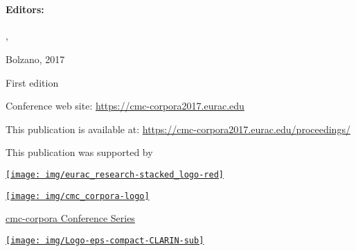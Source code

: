 \documentclass[usegeometry]{scrbook}
\title{\thetitle}
\begin{document}
\dominitoc
\pagestyle{scrheadings}

\frontmatter

\subject{Conference Proceedings}
\title{\thetitle}
\subtitle{3-4 October 2017, Eurac Research, Italy}

\author{}
\publishers{Editors \\ \authora \\ \authorb}
\date{}

\maketitle
\clearpage

\section*{\thetitle}
\paragraph{Editors:} \authora, \authorb

\bigskip
\noindent
Bolzano, 2017

\smallskip
\noindent
First edition

\bigskip 

\noindent
Conference web site:
\href{https://cmc-corpora2017.eurac.edu}{https://cmc-corpora2017.eurac.edu}

\smallskip
\noindent
This publication is available at:
\href{https://cmc-corpora2017.eurac.edu/proceedings/}{https://cmc-corpora2017.eurac.edu/proceedings/}

\vfill

This publication was supported by

\noindent
\begin{minipage}{.33\textwidth}%
    \center
    \href{http://www.eurac.edu}{\texttt{[image: img/eurac\_research-stacked\_logo-red]}}
\end{minipage}%
\begin{minipage}{.33\textwidth}%
    \center
    \href{http://cmc-corpora.org}{\texttt{[image: img/cmc\_corpora-logo]}}

    \smallskip 
    {\small \href{http://cmc-corpora.org}{cmc-corpora Conference Series}}
\end{minipage}
\begin{minipage}{.33\textwidth}%
    \center
    \href{https://www.clarin.eu}{\texttt{[image: img/Logo-eps-compact-CLARIN-sub]}}
\end{minipage}
\end{document}
